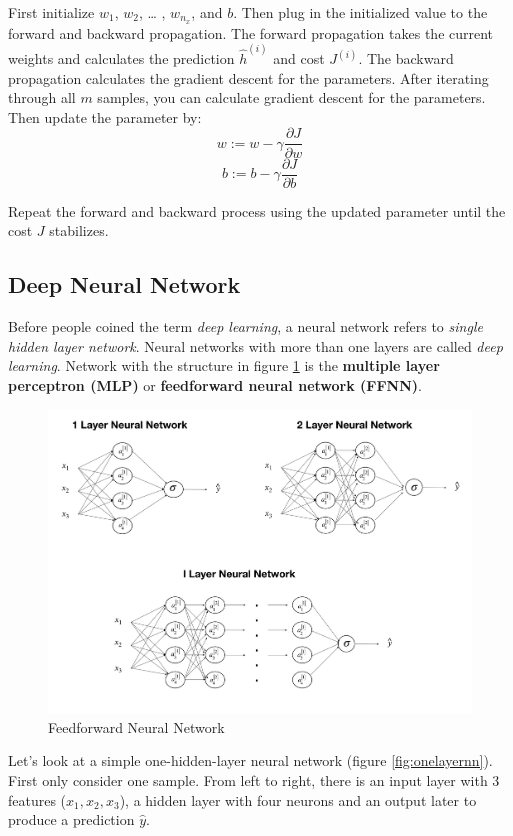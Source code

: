 \documentclass[
  12pt,
]{krantz}
\begin{document}
First initialize \(w_1\), \(w_2\), \ldots{} , \(w_{n_x}\), and \(b\). Then plug in the initialized value to the forward and backward propagation. The forward propagation takes the current weights and calculates the prediction \(\hat{h}^{(i)}\) and cost \(J^{(i)}\). The backward propagation calculates the gradient descent for the parameters. After iterating through all \(m\) samples, you can calculate gradient descent for the parameters. Then update the parameter by:
\[w := w - \gamma \frac{\partial J}{\partial w}\]
\[b := b - \gamma \frac{\partial J}{\partial b}\]

Repeat the forward and backward process using the updated parameter until the cost \(J\) stabilizes.

\hypertarget{deepneuralnetwork}{%
\subsection{Deep Neural Network}\label{deepneuralnetwork}}

Before people coined the term \emph{deep learning}, a neural network refers to \emph{single hidden layer network}. Neural networks with more than one layers are called \emph{deep learning}. Network with the structure in figure \ref{fig:ffnn} is the \textbf{multiple layer perceptron (MLP)} or \textbf{feedforward neural network (FFNN)}.

\begin{figure}

{\centering \includegraphics[width=0.8\linewidth]{images/dnn_str} 

}

\caption{Feedforward Neural Network}\label{fig:ffnn}
\end{figure}

Let's look at a simple one-hidden-layer neural network (figure \ref{fig:onelayernn}). First only consider one sample. From left to right, there is an input layer with 3 features (\(x_1, x_2, x_3\)), a hidden layer with four neurons and an output later to produce a prediction \(\hat{y}\).
\end{document}
